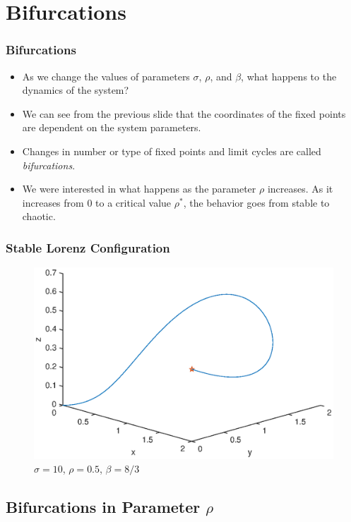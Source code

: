 \documentclass{beamer}
\begin{document}

\section{Bifurcations}

\begin{frame}
    \frametitle{Bifurcations}
    \begin{itemize}
        \item{As we change the values of parameters $\sigma$, $\rho$, and $\beta$, what happens to the dynamics of the system?}
        \item{We can see from the previous slide that the coordinates of the fixed points are dependent on the system parameters.}
        \item{Changes in number or type of fixed points and limit cycles are called \textit{bifurcations}.}
        \item{We were interested in what happens as the parameter $\rho$ increases. As it increases from 0 to a critical value $\rho^*$, the behavior goes from stable to chaotic.}
    \end{itemize}
\end{frame}

\begin{frame}
    \frametitle{Stable Lorenz Configuration}
    \begin{figure}
        \includegraphics[width=0.7\linewidth]{r05}
        \caption{$\sigma = 10$, $\rho = 0.5$, $\beta = 8/3$}
    \end{figure}
\end{frame}


\subsection{Bifurcations in Parameter $\rho$}
\end{document}
